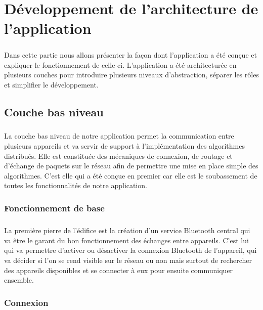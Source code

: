 \documentclass[a4paper,10pt]{report}
\begin{document}
\chapter{Développement de l'architecture de l'application}
  \paragraph{}
  Dans cette partie nous allons présenter la façon dont l'application a été conçue et expliquer le fonctionnement de celle-ci. L'application a été architecturée en plusieurs couches pour introduire plusieurs niveaux d'abstraction, séparer les rôles et simplifier le développement.
  
  \section{Couche bas niveau}
    \paragraph{}
    La couche bas niveau de notre application permet la communication entre plusieurs appareils et va servir de support à l'implémentation des algorithmes distribués. Elle est constituée des mécaniques de connexion, de routage et d'échange de paquets sur le réseau afin de permettre une mise en place simple des algorithmes. C'est elle qui a été conçue en premier car elle est le soubassement de toutes les fonctionnalités de notre application.
  
    \subsection{Fonctionnement de base}
    \paragraph{}
    La première pierre de l'édifice est la création d'un service Bluetooth central qui va être le garant du bon fonctionnement des échanges entre appareils. C'est lui qui va permettre d'activer ou désactiver la connexion Bluetooth de l'appareil, qui va décider si l'on se rend visible sur le réseau ou non mais surtout de rechercher des appareils disponibles et se connecter à eux pour ensuite communiquer ensemble.
    
    \subsection{Connexion}
\end{document}
